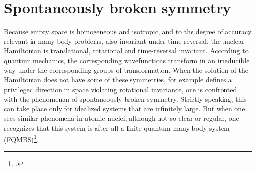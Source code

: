\section{Spontaneously broken symmetry}\label{S1.4}
Because empty space is homogeneous and isotropic, and to the degree of accuracy relevant in many-body problems, also invariant under time-reversal, the nuclear Hamiltonian is translational, rotational and time-reversal invariant. According to quantum mechanics, the corresponding wavefunctions transform in an irreducible way under the corresponding groups of transformation.
When the solution  of the Hamiltonian does not have some of these symmetries, for example defines a privileged direction in space violating rotational invariance, one is confronted with the phenomenon of spontaneously broken symmetry. Strictly speaking, this can take place only for idealized systems that are infinitely large. But when one sees similar phenomena in atomic nuclei, although not so clear or regular, one recognizes that this system is after all a finite quantum many-body system (FQMBS)\footnote{\cite{Anderson:72,Anderson:84b}.}.
